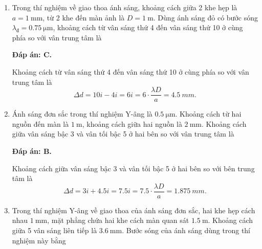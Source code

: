 \begin{enumerate}[label=\bfseries Câu \arabic*:]
\item {} 
		\cauhoi
	{Trong thí nghiệm về giao thoa ánh sáng, khoảng cách giữa 2 khe hẹp là $a=\SI{1}{\milli \meter}$, từ 2 khe đến màn ảnh là $D=\SI{1}{\meter}$. Dùng ánh sáng đỏ có bước sóng $\lambda_\text{đ}=\SI{0.75}{\micro \meter}$, khoảng cách từ vân sáng thứ 4 đến vân sáng thứ 10 ở cùng phía so với vân trung tâm là
	}
	
	\loigiai
	{		\textbf{Đáp án: C.}
		
Khoảng cách từ vân sáng thứ 4 đến vân sáng thứ 10 ở cùng phía so với vân trung tâm là
$$
	\Delta d = 10i - 4i = 6i = 6 \cdot \dfrac{\lambda D}{a} = \SI{4,5}{mm}.
$$
		
	}
	
\item {} 
		\cauhoi
	{Ánh sáng đơn sắc trong thí nghiệm Y-âng là $\SI{0.5}{\micro \meter}$. Khoảng cách từ hai nguồn đến màn là $\SI{1}{\meter}$, khoảng cách giữa hai nguồn là $\SI{2}{\milli \meter}$. Khoảng cách giữa vân sáng bậc 3 và vân tối bậc 5 ở hai bên so với vân trung tâm là
	}
	
	\loigiai
	{		\textbf{Đáp án: B.}
		
Khoảng cách giữa vân sáng bậc 3 và vân tối bậc 5 ở hai bên so với bên trung tâm là
$$
	\Delta d = 3i + \num{4,5}i = \num{7,5}i = \num{7,5} \cdot \dfrac{\lambda D}{a} = \SI{1,875}{mm}.
$$
		
	}
	
\item {} 
		\cauhoi
	{Trong thí nghiệm Y-âng về giao thoa của ánh sáng đơn sắc, hai khe hẹp cách nhau $\SI{1}{\milli \meter}$, mặt phẳng chứa hai khe cách màn quan sát $\SI{1.5}{\meter}$. Khoảng cách giữa 5 vân sáng liên tiếp là $\SI{3.6}{\milli \meter}$. Bước sóng của ánh sáng dùng trong thí nghiệm này bằng
	}
	

\end{enumerate}
